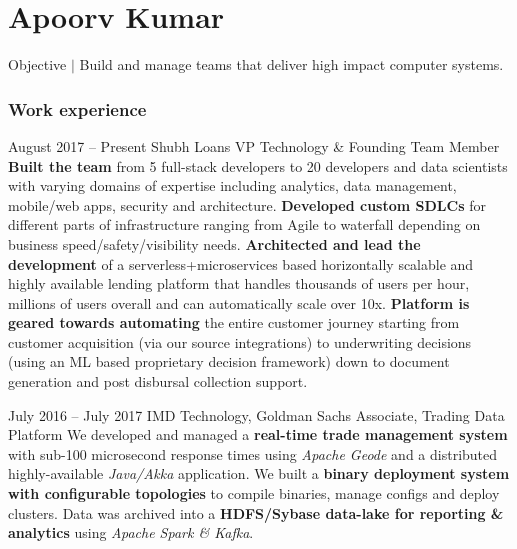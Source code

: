 \documentclass{tccv}
\begin{document}
\part{Apoorv Kumar}
	 {\selectfont\large Objective $\vert$ \selectfont\large Build and manage teams that deliver high impact computer systems.}
     
\section{Work experience}


\begin{eventlist}
\item{August 2017 -- Present}
	 {Shubh Loans}
	 {VP Technology \& Founding Team Member}
\textbf{Built the team} from 5 full-stack developers to 20 developers and data scientists with varying domains of expertise including analytics, data management, mobile/web apps, security and architecture.\newline
\textbf{Developed custom SDLCs} for different parts of infrastructure ranging from Agile to waterfall depending on business speed/safety/visibility needs.
\textbf{Architected and lead the development} of a serverless+microservices based horizontally scalable and highly available lending platform that handles thousands of users per hour, millions of users overall and can automatically scale over 10x.\newline
\textbf{Platform is geared towards automating} the entire customer journey starting from customer acquisition (via our source integrations) to underwriting decisions (using an ML based proprietary decision framework) down to document generation and post disbursal collection support.\newline


\item{July 2016 -- July 2017}
     {IMD Technology, Goldman Sachs}
     {Associate, Trading Data Platform}
     We developed and managed a \textbf{real-time trade management system} with sub-100 microsecond response times using \textit{Apache Geode} and a distributed highly-available \textit{Java/Akka} application. \newline
     We built a \textbf{binary deployment system with configurable topologies} to compile binaries, manage configs and deploy clusters. Data was archived into a \textbf{HDFS/Sybase data-lake for reporting \& analytics} using \textit{Apache Spark \& Kafka}.



\end{eventlist}
\end{document}
